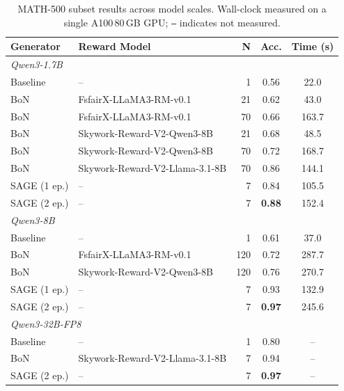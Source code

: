 \documentclass[11pt]{article}
\theoremstyle{plain}
\theoremstyle{definition}
\theoremstyle{remark}
\newcommand{\method}{SAGE}
\begin{document}
\begin{table}[h]
\centering
\begin{small}
\begin{sc}
\begin{tabular*}{\linewidth}{@{\extracolsep{\fill}} l l r c c @{}}
\toprule
\textbf{Generator} & \textbf{Reward Model} & \textbf{N} & \textbf{Acc.} & \textbf{Time (s)} \\
\midrule
\multicolumn{5}{l}{\textit{Qwen3-1.7B}} \\
Baseline          & --                                    &   1 & 0.56          & 22.0  \\
BoN               & FsfairX-LLaMA3-RM-v0.1               &  21 & 0.62          & 43.0  \\
BoN               & FsfairX-LLaMA3-RM-v0.1               &  70 & 0.66          & 163.7 \\
BoN               & Skywork-Reward-V2-Qwen3-8B            &  21 & 0.68          & 48.5  \\
BoN               & Skywork-Reward-V2-Qwen3-8B            &  70 & 0.72          & 168.7 \\
BoN               & Skywork-Reward-V2-Llama-3.1-8B        &  70 & 0.86          & 144.1 \\
\method{} (1 ep.) & --                                    &   7 & 0.84          & 105.5 \\
\method{} (2 ep.) & --                                    &   7 & \textbf{0.88} & 152.4 \\
\midrule
\multicolumn{5}{l}{\textit{Qwen3-8B}} \\
Baseline          & --                                    &   1 & 0.61          & 37.0  \\
BoN               & FsfairX-LLaMA3-RM-v0.1               & 120 & 0.72          & 287.7 \\
BoN               & Skywork-Reward-V2-Qwen3-8B            & 120 & 0.76          & 270.7 \\
\method{} (1 ep.) & --                                    &   7 & 0.93          & 132.9 \\
\method{} (2 ep.) & --                                    &   7 & \textbf{0.97} & 245.6 \\
\midrule
\multicolumn{5}{l}{\textit{Qwen3-32B-FP8}} \\
Baseline          & --                                    &   1 & 0.80          & --    \\
BoN               & Skywork-Reward-V2-Llama-3.1-8B        &   7 & 0.94          & --    \\
\method{} (2 ep.) & --                                    &   7 & \textbf{0.97} & --    \\
\bottomrule
\end{tabular*}
\end{sc}
\end{small}
\caption{MATH-500 subset results across model scales. Wall-clock measured on a single A100\,80\,GB GPU; \texttt{--} indicates not measured.}
\label{tab:small-large-models}
\end{table}
\end{document}
